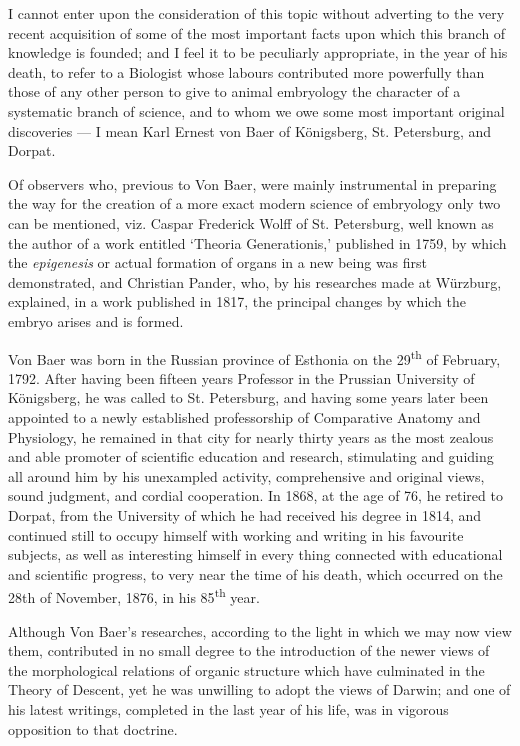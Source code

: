 \documentclass[a4paper, 11pt, oneside, english]{article}
\begin{document}
I cannot enter upon the consideration of this topic without adverting to the very recent acquisition of some of the most important facts upon which this branch of knowledge is founded; and I feel it to be peculiarly appropriate, in the year of his death, to refer to a Biologist whose labours contributed more powerfully than those of any other person to give to animal embryology the character of a systematic branch of science, and to whom we owe some most important original discoveries --- I mean Karl Ernest von Baer of Königsberg, St. Petersburg, and Dorpat.

Of observers who, previous to Von Baer, were mainly instrumental in preparing the way for the creation of a more exact modern science of embryology only two can be mentioned, viz. Caspar Frederick Wolff of St. Petersburg, well known as the author of a work entitled `Theoria Generationis,' published in 1759, by which the \emph{epigenesis} or actual formation of organs in a new being was first demonstrated, and Christian Pander, who, by his researches made at Würzburg, explained, in a work published in 1817, the principal changes by which the embryo arises and is formed.

Von Baer was born in the Russian province of Esthonia on the 29\textsuperscript{th} of February, 1792. After having been fifteen years Professor in the Prussian University of Königsberg, he was called to St. Petersburg, and having some years later been appointed to a newly established professorship of Comparative Anatomy and Physiology, he remained in that city for nearly thirty years as the most zealous and able promoter of scientific education and research, stimulating and guiding all around him by his unexampled activity, comprehensive and original views, sound judgment, and cordial cooperation. In 1868, at the age of 76, he retired to Dorpat, from the University of which he had received his degree in 1814, and continued still to occupy himself with working and writing in his favourite subjects, as well as interesting himself in every thing connected with educational and scientific progress, to very near the time of his death, which occurred on the 28th of November, 1876, in his 85\textsuperscript{th} year.

Although Von Baer's researches, according to the light in which we may now view them, contributed in no small degree to the introduction of the newer views of the morphological relations of organic structure which have culminated in the Theory of Descent, yet he was unwilling to adopt the views of Darwin; and one of his latest writings, completed in the last year of his life, was in vigorous opposition to that doctrine.
\end{document}
